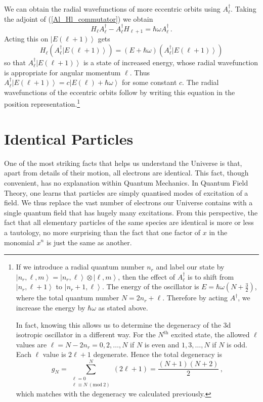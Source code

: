 \documentclass{article}
\theoremstyle{plain}\theoremheaderfont{\normalfont\itshape}\theorembodyfont{\rmfamily}\theoremseparator{.}\newtheorem*{rem}{Remark}\newtheorem*{ex}{Example}\newtheorem*{proof}{Proof}\newtheorem*{altp}{Alternative proof}
\theoremstyle{plain}\theoremheaderfont{\normalfont\bfseries}\theorembodyfont{\rmfamily}\theoremseparator{.}\newtheorem{thm}{Theorem}[section]\newtheorem{lem}[thm]{Lemma}\newtheorem{prop}[thm]{Proposition}\newtheorem*{cor}{Corollary}\newtheorem{defn}[thm]{Definition}\newtheorem{clm}[thm]{Claim}\newtheorem{clminproof}{Claim}
\theoremstyle{break}\theoremheaderfont{\normalfont\itshape}\theorembodyfont{\rmfamily}\theoremseparator{.\medskip}\newtheorem*{proofskip}{Proof}\newtheorem*{exs}{Examples}\newtheorem*{rems}{Remarks}
\theoremstyle{break}\theoremheaderfont{\normalfont\bfseries}\theorembodyfont{\rmfamily}\theoremseparator{.\medskip}\newtheorem{lemskip}[thm]{Lemma}\newtheorem{defnskip}[thm]{Definition}\newtheorem{propskip}[thm]{Proposition}\newtheorem{thmskip}[thm]{Theorem}
\numberwithin{equation}{section}
\newcommand{\ket}[1]{\left| #1 \right\rangle}
\begin{document}
    We can obtain the radial wavefunctions of more eccentric orbits using \(A_\ell^\dagger\). Taking the adjoint of (\ref{Al_Hl_commutator}) we obtain
    \begin{equation}
        H_\ell A_\ell^\dagger -A_\ell^\dagger H_{\ell+1}=\hbar\omega A_\ell^\dagger\,.
    \end{equation}
    Acting this on \(\ket{E(\ell+1)}\) gets
    \begin{equation}
        H_\ell(A_\ell^\dagger\ket{E(\ell+1)})=(E+\hbar\omega)(A_\ell^\dagger\ket{E(\ell+1)})
    \end{equation}
    so that \(A_\ell^\dagger\ket{E(\ell+1)}\) is a state of increased energy, whose radial wavefunction is appropriate for angular momentum \(\ell\). Thus \(A_\ell^\dagger\ket{E(\ell+1)}=c\ket{E(\ell)+\hbar\omega}\) for some constant \(c\). The radial wavefunctions of the eccentric orbits follow by writing this equation in the position representation.\footnote{If we introduce a radial quantum number \(n_r\) and label our state by \(\ket{n_r,\ell,m}=\ket{n_r,\ell}\otimes \ket{\ell,m}\), then the effect of \(A_\ell^\dagger\) is to shift from \(\ket{n_r,\ell+1}\) to \(\ket{n_r+1,\ell}\). The energy of the oscillator is \(E=\hbar\omega(N+\frac{3}{2})\), where the total quantum number \(N=2n_r+\ell\). Therefore by acting \(A^\dagger\), we increase the energy by \(\hbar\omega\) as stated above.
    
    In fact, knowing this allows us to determine the degeneracy of the 3d isotropic oscillator in a different way. For the \(N^{\text{th}}\) excited state, the allowed \(\ell\) values are \(\ell=N-2n_r=0,2,\dots,N\) if \(N\) is even and \(1,3,\dots,N\) if \(N\) is odd. Each \(\ell\) value is \(2\ell+1\) degenerate. Hence the total degeneracy is
    \begin{equation}
        g_N=\sum_{\substack{\ell=0\\ \ell\equiv N\ (\mathrm{mod}\ 2)}}^{N}(2\ell+1)=\frac{(N+1)(N+2)}{2}\,,
    \end{equation}
    which matches with the degeneracy we calculated previously.}

    \newpage
    \section{Identical Particles}\label{Chap:Identical_Particles}
    One of the most striking facts that helps us understand the Universe is that, apart from details of their motion, all electrons are identical. This fact, though convenient, has no explanation within Quantum Mechanics. In Quantum Field Theory, one learns that particles are simply quantised modes of excitation of a field. We thus replace the vast number of electrons our Universe contains with a single quantum field that has hugely many excitations. From this perspective, the fact that all elementary particles of the same species are identical is more or less a tautology, no more surprising than the fact that one factor of \(x\) in the monomial \(x^n\) is just the same as another.
\end{document}
